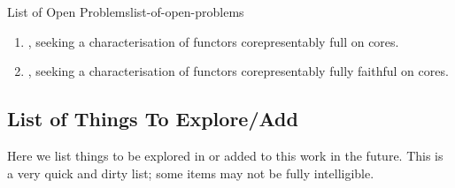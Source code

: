 \begin{remark}{List of Open Problems}{list-of-open-problems}
\begin{enumerate}
        \item {}, seeking a characterisation of functors corepresentably full on cores.
        \item {}, seeking a characterisation of functors corepresentably fully faithful on cores.
    \end{enumerate}
\end{remark}
\subsection{List of Things To Explore/Add}\label{subsection-things-to-explore-add}
Here we list things to be explored in or added to this work in the future. This is a very quick and dirty list; some items may not be fully intelligible.
